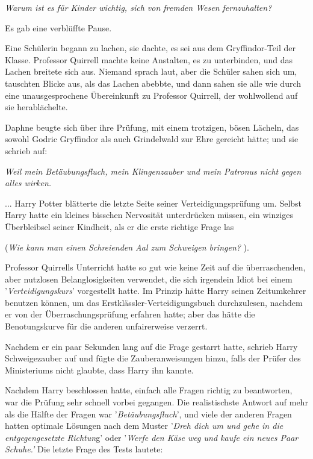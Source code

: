 \emph{\glqq Warum ist es für Kinder wichtig, sich von fremden Wesen
fernzuhalten?\grqq{} }

Es gab eine verblüffte Pause.

Eine Schülerin begann zu lachen, sie dachte, es sei aus dem Gryffindor-Teil der
Klasse. Professor Quirrell machte keine Anstalten, es zu unterbinden, und das
Lachen breitete sich aus. Niemand sprach laut, aber die Schüler sahen sich um,
tauschten Blicke aus, als das Lachen abebbte, und dann sahen sie alle wie durch
eine unausgesprochene Übereinkunft zu Professor Quirrell, der wohlwollend auf
sie herablächelte.

Daphne beugte sich über ihre Prüfung, mit einem trotzigen, bösen Lächeln, das
sowohl Godric Gryffindor als auch Grindelwald zur Ehre gereicht hätte; und sie
schrieb auf:

\emph{Weil mein Betäubungsfluch, mein Klingenzauber und mein Patronus nicht gegen alles wirken.}


... Harry Potter blätterte die letzte Seite seiner Verteidigungsprüfung um.
Selbst Harry hatte ein kleines bisschen Nervosität unterdrücken müssen, ein
winziges Überbleibsel seiner Kindheit, als er die erste richtige Frage las

(\emph{\glqq Wie kann man einen Schreienden Aal zum Schweigen bringen?\grqq{}
}).

Professor Quirrells Unterricht hatte so gut wie keine Zeit auf die
überraschenden, aber nutzlosen Belanglosigkeiten verwendet, die sich irgendein
Idiot bei einem '\emph{Verteidigungskurs}' vorgestellt hatte. Im Prinzip hätte
Harry seinen Zeitumkehrer benutzen können, um das Erstklässler-Verteidigungsbuch
durchzulesen, nachdem er von der Überraschungsprüfung erfahren hatte; aber das
hätte die Benotungskurve für die anderen unfairerweise verzerrt.

Nachdem er ein paar Sekunden lang auf die Frage gestarrt hatte, schrieb Harry
\glqq Schweigezauber\grqq{} auf und fügte die Zauberanweisungen hinzu, falls der
Prüfer des Ministeriums nicht glaubte, dass Harry ihn kannte.

Nachdem Harry beschlossen hatte, einfach alle Fragen richtig zu beantworten, war
die Prüfung sehr schnell vorbei gegangen. Die realistischste Antwort auf mehr
als die Hälfte der Fragen war '\emph{Betäubungsfluch}', und viele der anderen
Fragen hatten optimale Lösungen nach dem Muster '\emph{Dreh dich um und gehe in
die entgegengesetzte Richtun}g' oder '\emph{Werfe den Käse weg und kaufe ein
neues Paar Schuhe.'} Die letzte Frage des Tests lautete:

